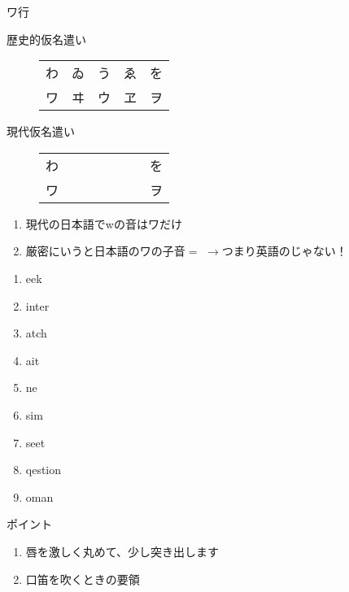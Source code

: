 \documentclass[aspectratio=169,xcolor={dvipsnames,table}]{beamer}
\begin{document}
\begin{frame}[plain]{ワ行}

\begin{description}
 \item[歴史的仮名遣い] \begin{tabular}[t]{ccccc}
		わ&ゐ&う&ゑ&を\\
		ワ&ヰ&ウ&ヱ&ヲ
		   \end{tabular}\pause
 \item[現代仮名遣い　] \begin{tabular}[t]{ccccc}
		わ&　&　&　&を\\
		ワ&&&&ヲ
		   \end{tabular}
\end{description}


\begin{enumerate}
 \item 現代の日本語でwの音はワだけ
 \item 厳密にいうと日本語のワの子音$=$\textipa{[\textsublhalfring{w}]}
$\longrightarrow$つまり英語のじゃない！

\end{enumerate}
\end{frame}
\begin{frame}[plain]{}

\large

\begin{enumerate}
 \item {}eek
 \item {}inter
 \item {}atch
 \item {}ait
 \item {}ne
 \item sim
 \item seet
 \item qestion
 \item {}oman
\end{enumerate}

\vspace*{10pt}

\small
ポイント

\begin{enumerate}
 \item 唇を激しく丸めて、少し突き出します
 \item 口笛を吹くときの要領
\hfill{\scriptsize {}}

\end{enumerate}
\end{frame}
\end{document}
